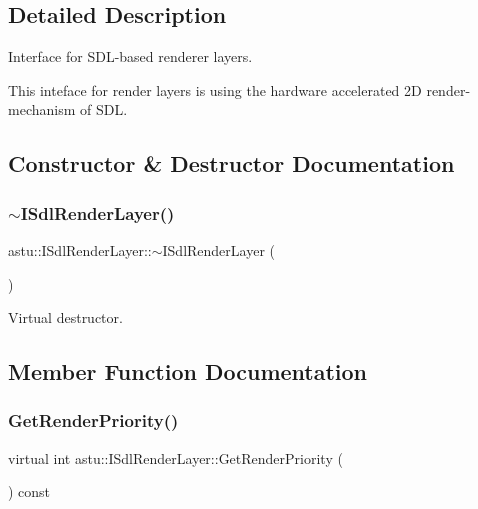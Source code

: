 \subsection{Detailed Description}
Interface for S\+D\+L-\/based renderer layers.

This inteface for render layers is using the hardware accelerated 2D render-\/mechanism of S\+DL. 

\subsection{Constructor \& Destructor Documentation}
\mbox{\label{classastu_1_1ISdlRenderLayer_af507055c193d430822d5aadb6cbaf6a9}} 
\subsubsection{\texorpdfstring{$\sim$\+I\+Sdl\+Render\+Layer()}{~ISdlRenderLayer()}}
{\footnotesize\ttfamily astu\+::\+I\+Sdl\+Render\+Layer\+::$\sim$\+I\+Sdl\+Render\+Layer (\begin{DoxyParamCaption}{ }\end{DoxyParamCaption})\hspace{0.3cm}{\ttfamily [inline]}}

Virtual destructor. 

\subsection{Member Function Documentation}
\mbox{\label{classastu_1_1ISdlRenderLayer_a623b411a1afa967bdaa879f5075eec43}} 
\subsubsection{\texorpdfstring{Get\+Render\+Priority()}{GetRenderPriority()}}
{\footnotesize\ttfamily virtual int astu\+::\+I\+Sdl\+Render\+Layer\+::\+Get\+Render\+Priority (\begin{DoxyParamCaption}{ }\end{DoxyParamCaption}) const\hspace{0.3cm}{\ttfamily [pure virtual]}}

